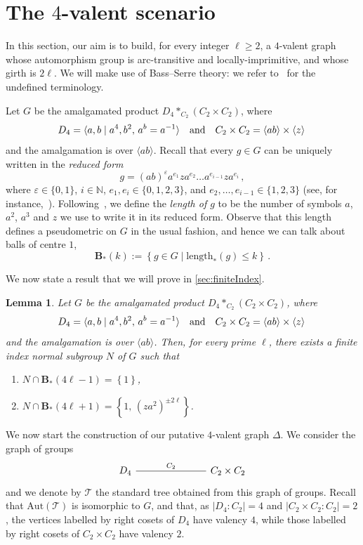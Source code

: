 \documentclass[a4paper]{amsart}
\newcommand{\len}{\mathrm{length}}
\newcommand{\B}{\mathbf{B}}
\newcommand{\0}{\mathbf{0}}
\newtheorem{lemma}[thm]{Lemma}
\theoremstyle{definition}
\begin{document}
\section{The \texorpdfstring{$4$}{4}-valent scenario}\label{sec:BassSerre}
In this section, our aim is to build, for every integer $\ell \ge 2$, a $4$-valent graph whose automorphism group is arc-transitive and locally-imprimitive, and whose girth is $2\ell$. We will make use of Bass--Serre theory: we refer to~\cite{DicksDunwoodyGroups,SerreTrees} for the undefined terminology.

Let $G$ be the amalgamated product $D_4 *_{C_2} (C_2\times C_2)$, where
\[ D_4 = \langle a,b \mid a^4, b^2, \, a^b=a^{-1} \rangle \quad \hbox{and} \quad  C_2 \times C_2 = \langle ab \rangle \times \langle z \rangle \, \]
and the amalgamation is over $ \langle ab \rangle$. Recall that every $g\in G$ can be uniquely written in the \emph{reduced form}
\[ g = (ab)^\varepsilon a^{e_1}za^{e_2} \ldots a^{e_{i-1}}za^{e_i} \,,\]
where $\varepsilon\in \{0,1\}$, $i \in \mathbb{N}$, $e_1,  e_i\in \{0,1,2,3\}$, and $e_2, \dots , e_{i-1}\in \{1,2,3\}$
(see, for instance,~\cite[Theorem~I.1]{SerreTrees}).
Following~\cite{SerreTrees}, we define the \emph{length of $g$} to be the number of symbols $a$, $a^2$, $a^3$ and $z$ we use to write it in its reduced form. Observe that this length defines a pseudometric on $G$ in the usual fashion, and hence we can talk about balls of centre $1$,
\[ \B_\ast(k) := \left\{ g \in G \mid \len_\ast(g)\le k \right\} \,.\]

We now state a result that we will prove in \cref{sec:finiteIndex}.
\begin{lemma}\label{lemma:finiteIndexNormal}
    Let $G$ be the amalgamated product $D_4 *_{C_2} (C_2\times C_2)$, where
    \[ D_4 = \langle a,b \mid a^4, b^2, \, a^b=a^{-1} \rangle \quad \hbox{and} \quad 
    C_2 \times C_2 = \langle ab \rangle \times \langle z \rangle \, \]
    and the amalgamation is over $ \langle ab \rangle$. Then, for every prime $\ell$, there exists a finite index normal subgroup $N$ of $G$ such that
    \begin{enumerate}[$(a)$]
        \item $N \cap \B_\ast(4\ell -1) = \left\{1\right\}$,
        \item $N \cap \B_\ast(4\ell + 1) = \left\{1, \, (za^2)^{\pm 2\ell} \right\}$.
    \end{enumerate}
\end{lemma}

We now start the construction of our putative $4$-valent graph $\Delta$. We consider the graph of groups
    \[\begin{tikzcd}
        D_4 &&& C_2 \times C_2
        \arrow["C_2", no head, from=1-1, to=1-4]
    \end{tikzcd}\]
and we denote by $\mathcal{T}$ the standard tree obtained from this graph of groups. Recall that $\mathrm{Aut}(\mathcal{T})$ is isomorphic to $G$, and that, as $|D_4:C_2|=4$ and $|C_2\times C_2:C_2|=2$, the vertices labelled by right cosets of $D_4$ have valency $4$, while those labelled by right cosets of $C_2\times C_2$ have valency $2$.
\end{document}
